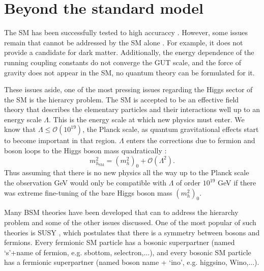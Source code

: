 \section{Beyond the standard model}
\label{sec:theory_BSM}
The \ac{SM} has been successfully tested to high accuraccy \cite{pdg-2014}. However,
some issues remain that cannot be addressed by the \ac{SM} alone \cite{griffiths}.
For example, it does not provide a candidate for dark matter. 
Additionally, the energy dependence of the running coupling constants
do not converge the GUT scale, and the force of gravity does not
appear in the \ac{SM}, no quantum theory can be formulated for it.

These issues aside, one of the most pressing issues regarding
the Higgs sector of the \ac{SM} is the hierarcy problem.
The \ac{SM}
is accepted to be an effective field theory that describes
the elementary particles and their interactions well up to an energy scale $\Lambda$.
This is the energy scale at which new physics must enter.
We know that $\Lambda \leq \mathcal{O}(10^{19})$, the Planck scale, as quantum 
gravitational effects start to become important in that region. $\Lambda$ enters
the corrections due to fermion and boson loops to the Higgs boson mass quadratically \cite{MSSM-carena-haber}:
\begin{equation}\label{eqn:mh_hierarchy}
m_{h_{\text{SM}}}^2  = (m_h^2)_0 + \mathcal{O}(\Lambda^2).
\end{equation}
Thus assuming that there is no new physics all the way up to
the Planck scale the observation  GeV would only be compatible with $\Lambda$ of order $10^{19}$ GeV
if there was extreme fine-tuning of the bare Higgs boson mass $(m_h^2)_0$.

Many \acf{BSM} theories have been developed
that can to address the hierarchy problem and some of the other issues 
discussed. One of the most
popular of such theories is \acf{SUSY} \cite{SUSY-primer}, which postulates
that there is a symmetry between bosons and fermions. Every fermionic
\ac{SM} particle has a bosonic superpartner (named `s'+name of fermion, e.g.
sbottom, selectron,...), and every bosonic \ac{SM} particle
has a fermionic superpartner (named boson name + `ino', e.g. higgsino, Wino,...).

